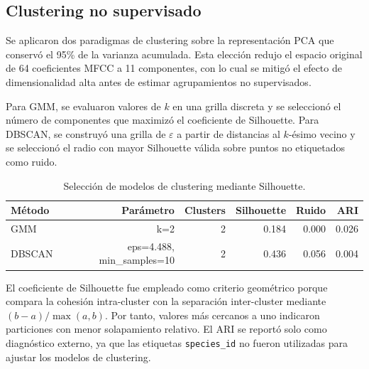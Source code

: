 \subsection{Clustering no supervisado}
Se aplicaron dos paradigmas de clustering sobre la representaci\'on PCA que conserv\'o el 95\% de la varianza acumulada. Esta elecci\'on redujo el espacio original de 64 coeficientes MFCC a 11 componentes, con lo cual se mitig\'o el efecto de dimensionalidad alta antes de estimar agrupamientos no supervisados.

Para GMM, se evaluaron valores de $k$ en una grilla discreta y se seleccion\'o el n\'umero de componentes que maximiz\'o el coeficiente de Silhouette. Para DBSCAN, se construy\'o una grilla de $\varepsilon$ a partir de distancias al $k$-\'esimo vecino y se seleccion\'o el radio con mayor Silhouette v\'alida sobre puntos no etiquetados como ruido.

\begin{table}[H]
\centering
\caption{Selecci\'on de modelos de clustering mediante Silhouette.}
\begin{tabular}{lrrrrr}
\hline
M\'etodo & Par\'ametro & Clusters & Silhouette & Ruido & ARI \\
\hline
GMM & k=2 & 2 & 0.184 & 0.000 & 0.026 \\
DBSCAN & eps=4.488, min_samples=10 & 2 & 0.436 & 0.056 & 0.004 \\
\hline
\end{tabular}
\end{table}

El coeficiente de Silhouette fue empleado como criterio geom\'etrico porque compara la cohesi\'on intra-cluster con la separaci\'on inter-cluster mediante $(b-a)/\max(a,b)$. Por tanto, valores m\'as cercanos a uno indicaron particiones con menor solapamiento relativo. El ARI se report\'o solo como diagn\'ostico externo, ya que las etiquetas \texttt{species\_id} no fueron utilizadas para ajustar los modelos de clustering.
